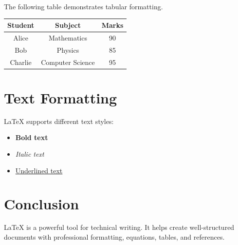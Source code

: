 \documentclass[12pt,a4paper]{article}
\begin{document}
The following table demonstrates tabular formatting.

\begin{center}
\begin{tabular}{|c|c|c|}
\hline
Student & Subject & Marks \\
\hline
Alice & Mathematics & 90 \\
Bob & Physics & 85 \\
Charlie & Computer Science & 95 \\
\hline
\end{tabular}
\end{center}

\section{Text Formatting}

LaTeX supports different text styles:

\begin{itemize}
    \item \textbf{Bold text}
    \item \textit{Italic text}
    \item \underline{Underlined text}
\end{itemize}

\section{Conclusion}

LaTeX is a powerful tool for technical writing.
It helps create well-structured documents with
professional formatting, equations, tables, and references.
\end{document}
